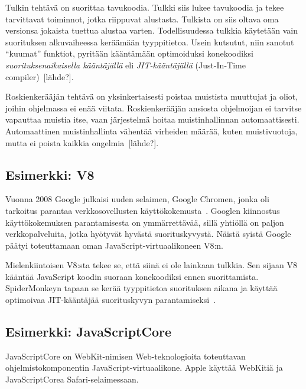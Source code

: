Tulkin tehtävä on suorittaa tavukoodia. Tulkki siis lukee tavukoodia ja tekee tarvittavat toiminnot, jotka riippuvat alustasta. Tulkista on siis oltava oma versionsa jokaista tuettua alustaa varten. Todellisuudessa tulkkia käytetään vain suorituksen alkuvaiheessa keräämään tyyppitietoa. Usein kutsutut, niin sanotut ``kuumat'' funktiot, pyritään kääntämään optimoiduksi konekoodiksi \textit{suorituksenaikaisella kääntäjällä} eli \textit{JIT-kääntäjällä} (Just-In-Time compiler)~[lähde?].

Roskienkerääjän tehtävä on yksinkertaisesti poistaa muistista muuttujat ja oliot, joihin ohjelmassa ei enää viitata. Roskienkerääjän ansiosta ohjelmoijan ei tarvitse vapauttaa muistia itse, vaan järjestelmä hoitaa muistinhallinnan automaattisesti. Automaattinen muistinhallinta vähentää virheiden määrää, kuten muistivuotoja, mutta ei poista kaikkia ongelmia~[lähde?].

\subsection{Esimerkki: V8}

Vuonna 2008 Google julkaisi uuden selaimen, Google Chromen, jonka oli tarkoitus parantaa verkkosovellusten käyttökokemusta~\cite{chromepress}. Googlen kiinnostus käyttökokemuksen parantamisesta on ymmärrettävää, sillä yhtiöllä on paljon verkkopalveluita, jotka hyötyvät hyvästä suorituskyvystä. Näistä syistä Google päätyi toteuttamaan oman JavaScript-virtuaalikoneen V8:n.

Mielenkiintoisen V8:sta tekee se, että siinä ei ole lainkaan tulkkia. Sen sijaan V8 kääntää JavaScript koodin suoraan konekoodiksi ennen suorittamista. SpiderMonkeyn tapaan se kerää tyyppitietoa suorituksen aikana ja käyttää optimoivaa JIT-kääntäjää suorituskyvyn parantamiseksi~\cite{v8compilers}.


\subsection{Esimerkki: JavaScriptCore}

JavaScriptCore on WebKit-nimisen Web-teknologioita toteuttavan ohjelmistokomponentin JavaScript-virtuaalikone. Apple käyttää WebKitiä ja \mbox{JavaScriptCorea} Safari-selaimessaan.

